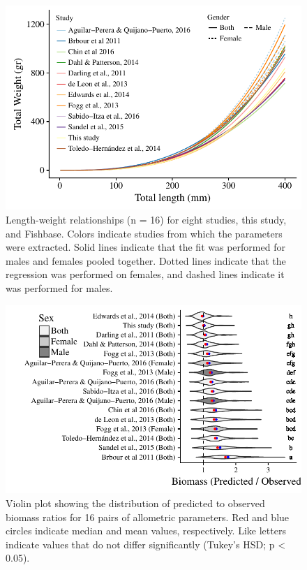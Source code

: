 \documentclass[fleqn,10pt,lineno]{wlpeerj} %
\begin{document}
\clearpage

\begin{figure}
\centering
\includegraphics{Manuscript_files/figure-latex/unnamed-chunk-5-1.pdf}
\caption{\label{fig:unnamed-chunk-5}\label{fig:all_allo}Length-weight
relationships (n = 16) for eight studies, this study, and Fishbase.
Colors indicate studies from which the parameters were extracted. Solid
lines indicate that the fit was performed for males and females pooled
together. Dotted lines indicate that the regression was performed on
females, and dashed lines indicate it was performed for males.}
\end{figure}

\begin{figure}
\centering
\includegraphics{Manuscript_files/figure-latex/unnamed-chunk-6-1.pdf}
\caption{\label{fig:unnamed-chunk-6}\label{fig:bio_ratio}Violin plot showing
the distribution of predicted to observed biomass ratios for 16 pairs of
allometric parameters. Red and blue circles indicate median and mean
values, respectively. Like letters indicate values that do not differ
significantly (Tukey's HSD; p \textless{} 0.05).}
\end{figure}
\end{document}

